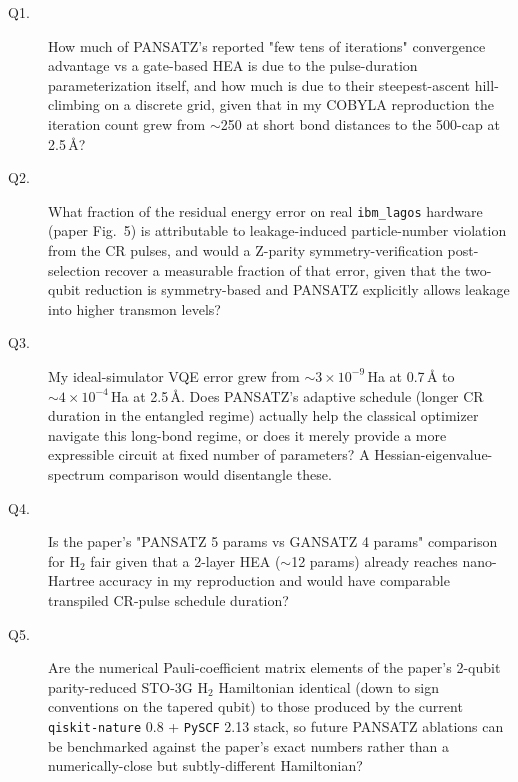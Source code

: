 \begin{description}
\item[Q1.] How much of PANSATZ's reported "few tens of iterations" convergence advantage vs a gate-based HEA is due to the pulse-duration parameterization itself, and how much is due to their steepest-ascent hill-climbing on a discrete grid, given that in my COBYLA reproduction the iteration count grew from $\sim$250 at short bond distances to the 500-cap at 2.5\,\AA?
\item[Q2.] What fraction of the residual energy error on real \texttt{ibm\_lagos} hardware (paper Fig.~5) is attributable to leakage-induced particle-number violation from the CR pulses, and would a Z-parity symmetry-verification post-selection recover a measurable fraction of that error, given that the two-qubit reduction is symmetry-based and PANSATZ explicitly allows leakage into higher transmon levels?
\item[Q3.] My ideal-simulator VQE error grew from $\sim 3\times 10^{-9}$\,Ha at 0.7\,\AA{} to $\sim 4\times 10^{-4}$\,Ha at 2.5\,\AA{}. Does PANSATZ's adaptive schedule (longer CR duration in the entangled regime) actually help the classical optimizer navigate this long-bond regime, or does it merely provide a more expressible circuit at fixed number of parameters? A Hessian-eigenvalue-spectrum comparison would disentangle these.
\item[Q4.] Is the paper's "PANSATZ 5 params vs GANSATZ 4 params" comparison for H$_2$ fair given that a 2-layer HEA ($\sim$12 params) already reaches nano-Hartree accuracy in my reproduction and would have comparable transpiled CR-pulse schedule duration?
\item[Q5.] Are the numerical Pauli-coefficient matrix elements of the paper's 2-qubit parity-reduced STO-3G H$_2$ Hamiltonian identical (down to sign conventions on the tapered qubit) to those produced by the current \texttt{qiskit-nature} 0.8 + \texttt{PySCF} 2.13 stack, so future PANSATZ ablations can be benchmarked against the paper's exact numbers rather than a numerically-close but subtly-different Hamiltonian?
\end{description}
